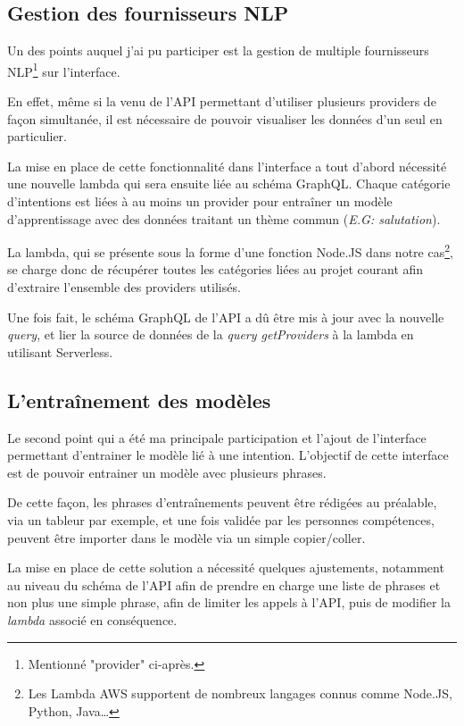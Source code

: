 \documentclass[12pt,a4paper,oneside]{scrreprt}
\begin{document}
\subsection{Gestion des fournisseurs NLP}

Un des points auquel j'ai pu participer est la gestion de multiple fournisseurs NLP\footnote{Mentionné "provider" ci-après.} sur l'interface.

En effet, même si la venu de l'API permettant d'utiliser plusieurs providers de façon simultanée, il est nécessaire de pouvoir visualiser les données d'un seul en particulier.

La mise en place de cette fonctionnalité dans l'interface a tout d'abord nécessité une nouvelle lambda qui sera ensuite liée au schéma GraphQL. Chaque catégorie d'intentions est liées à au moins un provider pour entraîner un modèle d'apprentissage avec des données traitant un thème commun (\textit{E.G: salutation}).

La lambda, qui se présente sous la forme d'une fonction Node.JS dans notre cas\footnote{Les Lambda AWS supportent de nombreux langages connus comme Node.JS, Python, Java\dots}, se charge donc de récupérer toutes les catégories liées au projet courant afin d'extraire l'ensemble des providers utilisés.

Une fois fait, le schéma GraphQL de l'API a dû être mis à jour avec la nouvelle \textit{query}, et lier la source de données de la \textit{query getProviders} à la lambda en utilisant Serverless.

\subsection{L'entraînement des modèles}

Le second point qui a été ma principale participation et l'ajout de l'interface permettant d'entrainer le modèle lié à une intention. L'objectif de cette interface est de pouvoir entrainer un modèle avec plusieurs phrases.

De cette façon, les phrases d'entraînements peuvent être rédigées au préalable, via un tableur par exemple, et une fois validée par les personnes compétences, peuvent être importer dans le modèle via un simple copier/coller.

La mise en place de cette solution a nécessité quelques ajustements, notamment au niveau du schéma de l'API afin de prendre en charge une liste de phrases et non plus une simple phrase, afin de limiter les appels à l'API, puis de modifier la \textit{lambda} associé en conséquence.
\end{document}
